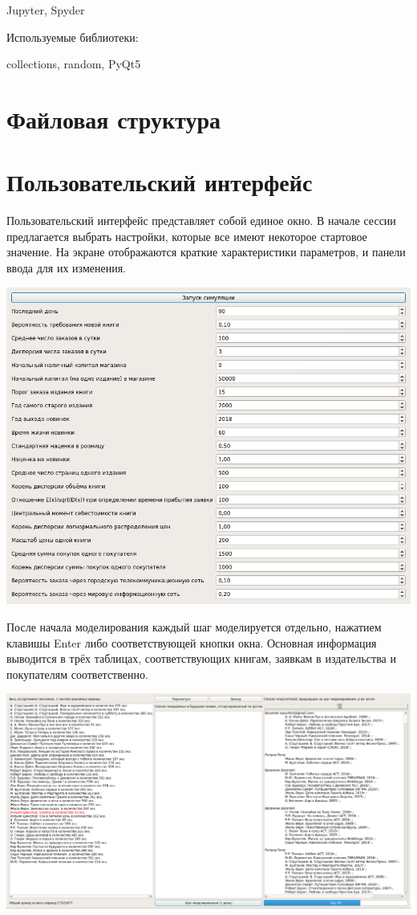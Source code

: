 \documentclass[final,12pt]{article}
\begin{document}
Jupyter, Spyder

Используемые библиотеки:

collections, random, PyQt5

\section{Файловая структура}

\section{Пользовательский интерфейс}
Пользовательский интерфейс представляет собой единое окно. В начале сессии предлагается выбрать настройки, которые все имеют некоторое стартовое значение. На экране отображаются краткие характеристики параметров, и панели ввода для их изменения.

\includegraphics[width=1.0\textwidth]{start_setup.png}

После начала моделирования каждый шаг моделируется отдельно, нажатием клавишы Enter либо соответствующей кнопки окна. Основная информация выводится в трёх таблицах, соответствующих книгам, заявкам в издательства и покупателям соответственно.

\includegraphics[width=1.0\textwidth]{step_60.png}
\end{document}
